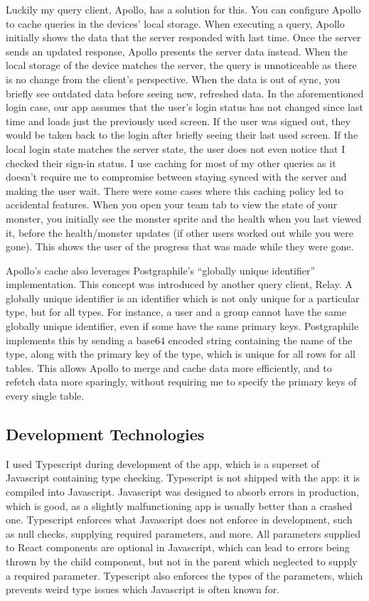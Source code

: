 \documentclass{l4proj}
\begin{document}
Luckily my query client, Apollo, has a solution for this. You can configure Apollo to cache queries in the devices' local storage. When executing a query, Apollo initially shows the data that the server responded with last time. Once the server sends an updated response, Apollo presents the server data instead. When the local storage of the device matches the server, the query is unnoticeable as there is no change from the client's perspective. When the data is out of sync, you briefly see outdated data before seeing new, refreshed data. In the aforementioned login case, our app assumes that the user's login status has not changed since last time and loads just the previously used screen. If the user was signed out, they would be taken back to the login after briefly seeing their last used screen. If the local login state matches the server state, the user does not even notice that I checked their sign-in status. I use caching for most of my other queries as it doesn't require me to compromise between staying synced with the server and making the user wait. There were some cases where this caching policy led to accidental features. When you open your team tab to view the state of your monster, you initially see the monster sprite and the health when you last viewed it, before the health/monster updates (if other users worked out while you were gone). This shows the user of the progress that was made while they were gone.

Apollo's cache also leverages Postgraphile's ``globally unique identifier'' implementation. This concept was introduced by another query client, Relay. A globally unique identifier is an identifier which is not only unique for a particular type, but for all types. For instance, a user and a group cannot have the same globally unique identifier, even if some have the same primary keys. Postgraphile implements this by sending a base64 encoded string containing the name of the type, along with the primary key of the type, which is unique for all rows for all tables. This allows Apollo to merge and cache data more efficiently, and to refetch data more sparingly, without requiring me to specify the primary keys of every single table.

\subsection{Development Technologies}
I used Typescript during development of the app, which is a superset of Javascript containing type checking. Typescript is not shipped with the app: it is compiled into Javascript. Javascript was designed to absorb errors in production, which is good, as a slightly malfunctioning app is usually better than a crashed one. Typescript enforces what Javascript does not enforce in development, such as null checks, supplying required parameters, and more. All parameters supplied to React components are optional in Javascript, which can lead to errors being thrown by the child component, but not in the parent which neglected to supply a required parameter. Typescript also enforces the types of the parameters, which prevents weird type issues which Javascript is often known for.
\end{document}
